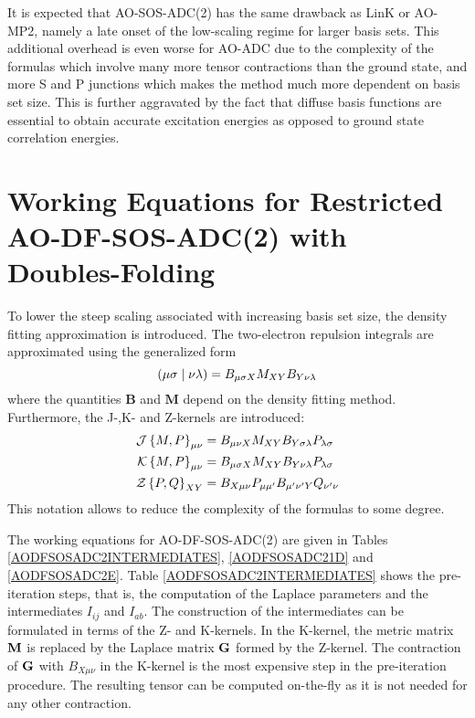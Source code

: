 It is expected that AO-SOS-ADC(2) has the same drawback as LinK or AO-MP2, namely a late onset of the low-scaling regime for larger basis sets. This additional overhead is even worse for AO-ADC due to the complexity of the formulas which involve many more tensor contractions than the ground state, and more S and P junctions which makes the method much more dependent on basis set size. This is further aggravated by the fact that diffuse basis functions are essential to obtain accurate excitation energies as opposed to ground state correlation energies.

\section{Working Equations for Restricted AO-DF-SOS-ADC(2) with Doubles-Folding}

To lower the steep scaling associated with increasing basis set size, the density fitting approximation is introduced. The two-electron repulsion integrals are approximated using the generalized form
\begin{equation}
\left( \mu\sigma \mid \nu\lambda \right) = B_{\mu\sigma X} M_{XY} B_{Y \nu\lambda}
\end{equation}
\noindent where the quantities $\mathbf{B}$ and $\mathbf{M}$ depend on the density fitting method. Furthermore, the J-,K- and Z-kernels are introduced:
\begin{align}
\mathcal{J}\left\lbrace M,P \right\rbrace_{\mu\nu} &= B_{\mu\nu X} M_{XY} B_{Y\sigma\lambda} P_{\lambda\sigma} \\
\mathcal{K}\left\lbrace M,P \right\rbrace_{\mu\nu} &= B_{\mu\sigma X} M_{XY} B_{Y \nu\lambda} P_{\lambda\sigma} \\
\mathcal{Z}\left\lbrace P,Q \right\rbrace_{XY} &= B_{X\mu\nu} P_{\mu\mu'} B_{\mu'\nu' Y} Q_{\nu' \nu} 
\end{align}
\noindent This notation allows to reduce the complexity of the formulas to some degree. 

The working equations for AO-DF-SOS-ADC(2) are given in Tables \ref{AODFSOSADC2INTERMEDIATES}, \ref{AODFSOSADC21D} and \ref{AODFSOSADC2E}. Table \ref{AODFSOSADC2INTERMEDIATES} shows the pre-iteration steps, that is, the computation of the Laplace parameters and the intermediates $I_{ij}$ and $I_{ab}$. The construction of the intermediates can be formulated in terms of the Z- and K-kernels. In the K-kernel, the metric matrix $\mathbf{M}$ is replaced by the Laplace matrix $\mathbf{G}$ formed by the Z-kernel. The contraction of $\mathbf{G}$ with $B_{X\mu\nu}$ in the K-kernel is the most expensive step in the pre-iteration procedure. The resulting tensor can be computed on-the-fly as it is not needed for any other contraction.

